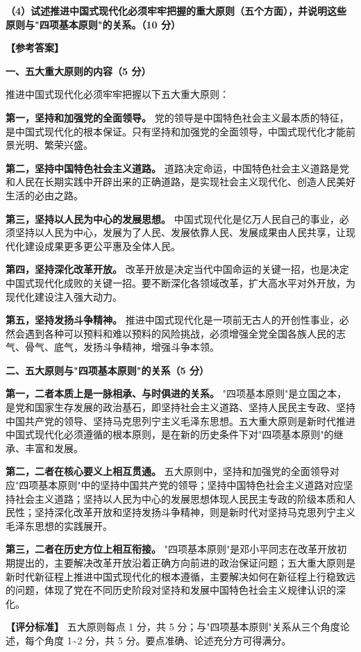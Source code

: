 \documentclass[12pt, a4paper]{article}
\begin{document}
\begin{answerbox}
\textbf{（4）试述推进中国式现代化必须牢牢把握的重大原则（五个方面），并说明这些原则与"四项基本原则"的关系。（10 分）}

\textbf{【参考答案】}

\textbf{一、五大重大原则的内容（5 分）}

推进中国式现代化必须牢牢把握以下五大重大原则：

\textbf{第一，坚持和加强党的全面领导。} 党的领导是中国特色社会主义最本质的特征，是中国式现代化的根本保证。只有坚持和加强党的全面领导，中国式现代化才能前景光明、繁荣兴盛。

\textbf{第二，坚持中国特色社会主义道路。} 道路决定命运，中国特色社会主义道路是党和人民在长期实践中开辟出来的正确道路，是实现社会主义现代化、创造人民美好生活的必由之路。

\textbf{第三，坚持以人民为中心的发展思想。} 中国式现代化是亿万人民自己的事业，必须坚持以人民为中心，发展为了人民、发展依靠人民、发展成果由人民共享，让现代化建设成果更多更公平惠及全体人民。

\textbf{第四，坚持深化改革开放。} 改革开放是决定当代中国命运的关键一招，也是决定中国式现代化成败的关键一招。要不断深化各领域改革，扩大高水平对外开放，为现代化建设注入强大动力。

\textbf{第五，坚持发扬斗争精神。} 推进中国式现代化是一项前无古人的开创性事业，必然会遇到各种可以预料和难以预料的风险挑战，必须增强全党全国各族人民的志气、骨气、底气，发扬斗争精神，增强斗争本领。

\textbf{二、五大原则与"四项基本原则"的关系（5 分）}

\textbf{第一，二者本质上是一脉相承、与时俱进的关系。} "四项基本原则"是立国之本，是党和国家生存发展的政治基石，即坚持社会主义道路、坚持人民民主专政、坚持中国共产党的领导、坚持马克思列宁主义毛泽东思想。五大重大原则是新时代推进中国式现代化必须遵循的根本原则，是在新的历史条件下对"四项基本原则"的继承、丰富和发展。

\textbf{第二，二者在核心要义上相互贯通。} 五大原则中，坚持和加强党的全面领导对应"四项基本原则"中的坚持中国共产党的领导；坚持中国特色社会主义道路对应坚持社会主义道路；坚持以人民为中心的发展思想体现人民民主专政的阶级本质和人民性；坚持深化改革开放和坚持发扬斗争精神，则是新时代对坚持马克思列宁主义毛泽东思想的实践展开。

\textbf{第三，二者在历史方位上相互衔接。} "四项基本原则"是邓小平同志在改革开放初期提出的，主要解决改革开放沿着正确方向前进的政治保证问题；五大重大原则是新时代新征程上推进中国式现代化的根本遵循，主要解决如何在新征程上行稳致远的问题，体现了党在不同历史阶段对坚持和发展中国特色社会主义规律认识的深化。

\textbf{【评分标准】} 五大原则每点 1 分，共 5 分；与"四项基本原则"关系从三个角度论述，每个角度 1\textasciitilde 2 分，共 5 分。要点准确、论述充分方可得满分。
\end{answerbox}
\end{document}

